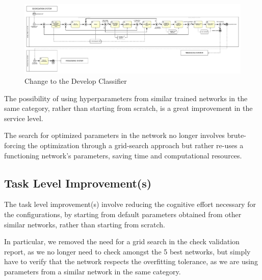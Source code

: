 \begin{figure}[H]
    \centering
    \includegraphics[width=1\textwidth]{figures/TO-BE Business Diagram - Develop Classifier.pdf}
    \caption{Change to the Develop Classifier}
    \label{fig:to_be_develop_classifier}
\end{figure}

The possibility of using hyperparameters from similar trained networks in the same category, rather than starting from scratch, is a great improvement in the service level.

The search for optimized parameters in the network no longer involves brute-forcing the optimization through a grid-search approach but rather re-uses a functioning network's parameters, saving time and computational resources.



\subsection{Task Level Improvement(s)}
\label{subsec:task_level_improvements}

The task level improvement(s) involve reducing the cognitive effort necessary for the configurations, by starting from default parameters obtained from other similar networks, rather than starting from scratch.

In particular, we removed the need for a grid search in the check validation report, as we no longer need to check amongst the 5 best networks, but simply have to verify that the network respects the overfitting tolerance, as we are using parameters from a similar network in the same category.

